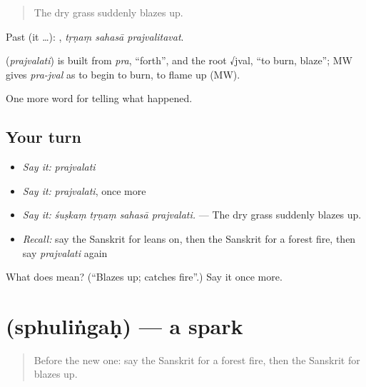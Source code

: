 \begin{quote}
The dry grass suddenly blazes up.
\end{quote}

Past (it …):   , \emph{tṛṇaṃ sahasā prajvalitavat}.

\begin{cousinweb}
\textbf{} (\emph{prajvalati}) is built from \emph{pra}, \textquotedblleft{}forth\textquotedblright{}, and the root √jval, \textquotedblleft{}to burn, blaze\textquotedblright{}; MW gives \emph{pra-jval} as to begin to burn, to flame up (MW).
\end{cousinweb}

\begin{grammarlens}[title={What you've built}]
One more word for telling what happened.
\end{grammarlens}

\subsection*{Your turn}
\begin{itemize}
\raggedright
  \item \emph{Say it:} \emph{prajvalati}
  \item \emph{Say it:} \emph{prajvalati}, once more
  \item \emph{Say it:} \emph{śuṣkaṃ tṛṇaṃ sahasā prajvalati.} — The dry grass suddenly blazes up.
  \item \emph{Recall:} say the Sanskrit for leans on, then the Sanskrit for a forest fire, then say \emph{prajvalati} again
\end{itemize}

\begin{tcolorbox}[breakable,colback=teal!4,colframe=teal!35!black,title={Before you move on}]
What does  mean? (\textquotedblleft{}Blazes up; catches fire\textquotedblright{}.) Say it once more.
\end{tcolorbox}
\section[\texorpdfstring{\sk{स्फुलिंगः} (sphuliṅgaḥ)}{स्फुलिंगः (sphuliṅgaḥ)}]{ (sphuliṅgaḥ) — a spark}

\label{lesson:SA-C296-sphulingah}



\begin{quote}
Before the new one: say the Sanskrit for a forest fire, then the Sanskrit for blazes up.
\end{quote}


